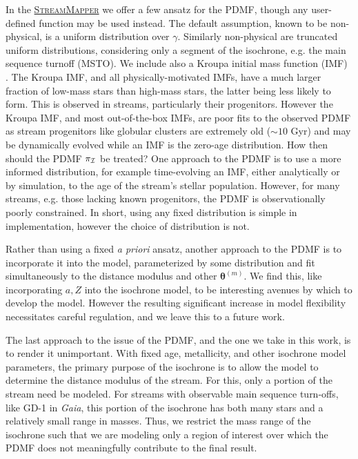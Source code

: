 \documentclass[twocolumn]{aastex631}
\newcommand{\code}[1]{\textsc{#1}}
\newcommand{\package}[1]{\code{#1}}
\newcommand{\stream}[1]{#1}
\newcommand{\dataarchive}[1]{\textit{#1}}
\newcommand{\Gaia}{\dataarchive{Gaia}}
\newcommand{\mbs}[1]{\boldsymbol{#1}}
\newcommand{\mcal}[1]{\mathcal{#1}}
\newcommand{\prior}{\mcal{\pi}}
\newcommand{\smallcomponent}[2]{#2^{\scriptscriptstyle (#1)}}
\newcommand{\cmp}[2]{\smallcomponent{#1}{#2}}
\begin{document}
            In the
            \href{https://github.com/GalOrrery/stream_mapper-pytorch}{\package{StreamMapper}}
            we offer a few ansatz for the PDMF, though any user-defined function
            may be used instead. The default assumption, known to be
            non-physical, is a uniform distribution over $\gamma$.  Similarly
            non-physical are truncated uniform distributions, considering only a
            segment of the isochrone, e.g. the main sequence turnoff (MSTO). We
            include also a Kroupa initial mass function (IMF)
            \citep{Kroupa2001}. The Kroupa IMF, and all physically-motivated
            IMFs, have a much larger fraction of low-mass stars than high-mass
            stars, the latter being less likely to form.  This is observed in
            streams, particularly their progenitors. However the Kroupa IMF, and
            most out-of-the-box IMFs, are poor fits to the observed PDMF as
            stream progenitors like globular clusters are extremely old
            ($\sim10$ Gyr) and may be dynamically evolved
            \citep{GrillmairSmith2001} while an IMF is the zero-age
            distribution.  How then should the PDMF $\prior_{\cal{I}}$ be
            treated?  One approach to the PDMF is to use a more informed
            distribution, for example time-evolving an IMF, either analytically
            or by simulation, to the age of the stream's stellar population.
            However, for many streams, e.g. those lacking known progenitors, the
            PDMF is observationally poorly constrained.  In short, using any
            fixed distribution is simple in implementation, however the choice
            of distribution is not.

            Rather than using a fixed \textit{a priori} ansatz, another approach
            to the PDMF is to incorporate it into the model, parameterized by
            some distribution and fit simultaneously to the distance modulus and
            other $\cmp{m}{\mbs{\theta}}$.  We find this, like incorporating $a,
            Z$ into the isochrone model, to be interesting avenues by which to
            develop the model. However the resulting significant increase in
            model flexibility necessitates careful regulation, and we leave this
            to a future work.

            The last approach to the issue of the PDMF, and the one we take in
            this work, is to render it unimportant.  With fixed age,
            metallicity, and other isochrone model parameters, the primary
            purpose of the isochrone is to allow the model to determine the
            distance modulus of the stream. For this, only a portion of the
            stream need be modeled.  For streams with observable main sequence
            turn-offs, like \stream{GD-1} in \Gaia, this portion of the
            isochrone has both many stars and a relatively small range in
            masses. Thus, we restrict the mass range of the isochrone such that
            we are modeling only a region of interest over which the PDMF does
            not meaningfully contribute to the final result.
\end{document}
